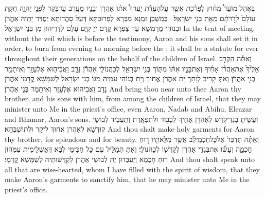 {בְּאֹ֣הֶל מוֹעֵד֩ מִח֨וּץ לַפָּרֹ֜כֶת אֲשֶׁ֣ר עַל\maqqaf הָעֵדֻ֗ת יַעֲרֹךְ֩ אֹת֨וֹ אַהֲרֹ֧ן וּבָנָ֛יו מֵעֶ֥רֶב עַד\maqqaf בֹּ֖קֶר לִפְנֵ֣י יְהֹוָ֑ה חֻקַּ֤ת עוֹלָם֙ לְדֹ֣רֹתָ֔ם מֵאֵ֖ת בְּנֵ֥י יִשְׂרָאֵֽל׃ \setuma }
{בְּמַשְׁכַּן זִמְנָא מִבַּרָא לְפָרוּכְתָּא דְּעַל סָהֲדוּתָא יַסְדַּר יָתֵיהּ אַהֲרֹן וּבְנוֹהִי מֵרַמְשָׁא עַד צַפְרָא קֳדָם יְיָ קְיָם עָלַם לְדָרֵיהוֹן מִן בְּנֵי יִשְׂרָאֵל׃}
{In the tent of meeting, without the veil which is before the testimony, Aaron and his sons shall set it in order, to burn from evening to morning before the \lord; it shall be a statute for ever throughout their generations on the behalf of the children of Israel.}{}
\newperek
{}%
{וְאַתָּ֡ה הַקְרֵ֣ב אֵלֶ֩יךָ֩ אֶת\maqqaf אַהֲרֹ֨ן אָחִ֜יךָ וְאֶת\maqqaf בָּנָ֣יו אִתּ֗וֹ מִתּ֛וֹךְ בְּנֵ֥י יִשְׂרָאֵ֖ל לְכַהֲנוֹ\maqqaf לִ֑י אַהֲרֹ֕ן נָדָ֧ב וַאֲבִיה֛וּא אֶלְעָזָ֥ר וְאִיתָמָ֖ר בְּנֵ֥י אַהֲרֹֽן׃}
{וְאַתְּ קָרֵיב לְוָתָךְ יָת אַהֲרֹן אֲחוּךְ וְיָת בְּנוֹהִי עִמֵּיהּ מִגּוֹ בְנֵי יִשְׂרָאֵל לְשַׁמָּשָׁא קֳדָמָי אַהֲרֹן נָדָב וַאֲבִיהוּא אֶלְעָזָר וְאִיתָמָר בְּנֵי אַהֲרֹן׃}
{And bring thou near unto thee Aaron thy brother, and his sons with him, from among the children of Israel, that they may minister unto Me in the priest’s office, even Aaron, Nadab and Abihu, Eleazar and Ithamar, Aaron’s sons.}{}
{וְעָשִׂ֥יתָ בִגְדֵי\maqqaf קֹ֖דֶשׁ לְאַהֲרֹ֣ן אָחִ֑יךָ לְכָב֖וֹד וּלְתִפְאָֽרֶת׃}
{וְתַעֲבֵיד לְבוּשֵׁי קוּדְשָׁא לְאַהֲרֹן אֲחוּךְ לִיקָר וּלְתוּשְׁבְּחָא׃}
{And thou shalt make holy garments for Aaron thy brother, for splendour and for beauty.}{}
{וְאַתָּ֗ה תְּדַבֵּר֙ אֶל\maqqaf כׇּל\maqqaf חַכְמֵי\maqqaf לֵ֔ב אֲשֶׁ֥ר מִלֵּאתִ֖יו ר֣וּחַ חׇכְמָ֑ה וְעָשׂ֞וּ אֶת\maqqaf בִּגְדֵ֧י אַהֲרֹ֛ן לְקַדְּשׁ֖וֹ לְכַהֲנוֹ\maqqaf לִֽי׃}
{וְאַתְּ תְּמַלֵּיל עִם כָּל חַכִּימֵי לִבָּא דְּאַשְׁלֵימִית עִמְּהוֹן רוּחַ חָכְמָא וְיַעְבְּדוּן יָת לְבוּשֵׁי אַהֲרֹן לְקַדָּשׁוּתֵיהּ לְשַׁמָּשָׁא קֳדָמָי׃}
{And thou shalt speak unto all that are wise-hearted, whom I have filled with the spirit of wisdom, that they make Aaron’s garments to sanctify him, that he may minister unto Me in the priest’s office.}{}
